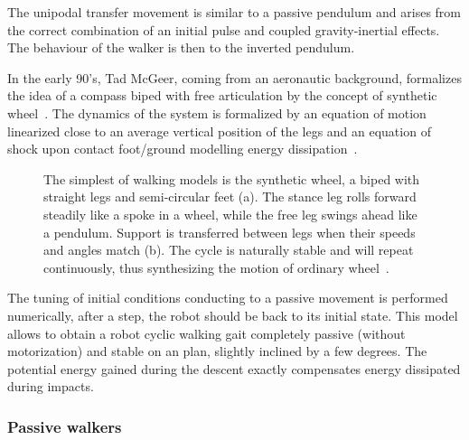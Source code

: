 The unipodal transfer movement is similar to a passive pendulum and arises from the correct combination of an initial pulse and coupled gravity-inertial effects. The behaviour of the walker is then to the inverted pendulum.

In the early 90's, Tad McGeer, coming from an aeronautic background, formalizes the idea of a compass biped with free articulation by the concept of synthetic wheel~\cite{mcgeer1990passive}.
The dynamics of the system is formalized by an equation of motion linearized close to an average vertical position of the legs and an equation of shock upon contact foot/ground modelling energy dissipation~\cite{mcgeer1992principles}.

\begin{figure}[tb]
\centering
    \hfil
    \caption{The simplest of walking models is the synthetic wheel, a biped with straight legs and semi-circular feet (a). The stance leg rolls forward steadily like a spoke in a wheel, while the free leg swings ahead like a pendulum. Support is transferred between legs when their speeds and angles match (b). The cycle is naturally stable and will repeat continuously, thus synthesizing the motion of ordinary wheel~\cite{mcgeer1992principles}.}
    \label{fig:synthetic-wheel}
\end{figure}


The tuning of initial conditions conducting to a passive movement is performed numerically, after a step, the robot should be back to its initial state. This model allows to obtain a robot cyclic walking gait completely passive (without motorization) and stable on an plan, slightly inclined by a few degrees. The potential energy gained during the descent exactly compensates energy dissipated during impacts.


\subsubsection{Passive walkers} %

\begin{figure}[tb]
\centering
    \hfil
    \caption{}
    \label{fig:mcgeer_work}
\end{figure}

